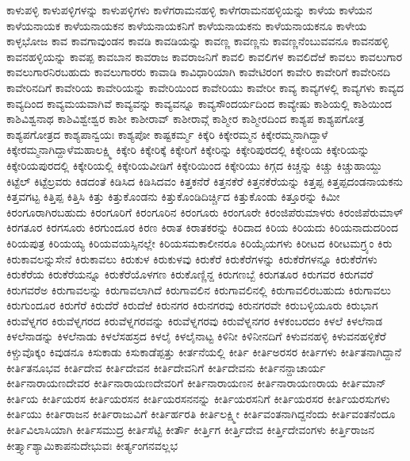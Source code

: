 {ಕಾಳುಪಳ್ಳಿ
ಕಾಳುಪಳ್ಳಿಗಳನ್ನು
ಕಾಳುಪಳ್ಳಿಗಳು
ಕಾಳೆಗರಾಮನಹಳ್ಳಿ
ಕಾಳೆಗರಾಮನಹಳ್ಳಿಯನ್ನು
ಕಾಳೆಯ
ಕಾಳೆಯನ
ಕಾಳೆಯನಾಯಕ
ಕಾಳೆಯನಾಯಕನ
ಕಾಳೆಯನಾಯಕನಿಗೆ
ಕಾಳೆಯನಾಯಕನು
ಕಾಳೆಯನಾಯಕನೂ
ಕಾಳೇಯ
ಕಾಳ್ಳಭೋಜ
ಕಾವ
ಕಾವಗಾವುಂಡನ
ಕಾವಡಿ
ಕಾವಡಿಯನ್ನು
ಕಾವಣ್ಣ
ಕಾವಣ್ಣನು
ಕಾವಣ್ಣನೆಂಬುವವನೂ
ಕಾವನಹಳ್ಳಿ
ಕಾವನಹಳ್ಳಿಯನ್ನು
ಕಾವಪ್ಪ
ಕಾವಬಾನ
ಕಾವರಾಜ
ಕಾವರಾಜನಿಗೆ
ಕಾವಲಿ
ಕಾವಲಿಗಳ
ಕಾವಲಿದೆಱೆ
ಕಾವಲು
ಕಾವಲುಗಾರ
ಕಾವಲುಗಾರನಿರಬಹುದು
ಕಾವಲುಗಾರರು
ಕಾವಾಡಿ
ಕಾವಿಧಾರಿಯಾಗಿ
ಕಾವೇಟಿರಂಗ
ಕಾವೇರಿ
ಕಾವೇರಿಗೆ
ಕಾವೇರಿನದಿ
ಕಾವೇರಿನದಿಗೆ
ಕಾವೇರಿಯ
ಕಾವೇರಿಯನ್ನು
ಕಾವೇರಿಯಿಂದ
ಕಾವೇರಿಯು
ಕಾವೇರೀ
ಕಾವ್ಯ
ಕಾವ್ಯಗಳಲ್ಲಿ
ಕಾವ್ಯಗಳು
ಕಾವ್ಯದ
ಕಾವ್ಯದಿಂದ
ಕಾವ್ಯಮಯವಾಗಿವೆ
ಕಾವ್ಯವನ್ನು
ಕಾವ್ಯವನ್ನೂ
ಕಾವ್ಯಸೌಂದರ್ಯದಿಂದ
ಕಾವ್ಯೇಷು
ಕಾಶಿಯಲ್ಲಿ
ಕಾಶಿಯಿಂದ
ಕಾಶಿವಿಶ್ವನಾಥ
ಕಾಶಿವಿಶ್ವೇಶ್ವರ
ಕಾಶೀ
ಕಾಶೀರಾವ್
ಕಾಶೀರಾವ್ಗೆ
ಕಾಶ್ಮೀರ
ಕಾಶ್ಮೀರದಿಂದ
ಕಾಶ್ಯಪ
ಕಾಶ್ಯಪಗೋತ್ರ
ಕಾಶ್ಯಪಗೋತ್ರದ
ಕಾಶ್ಯಪಾನ್ವಯಃ
ಕಾಶ್ಯಪೋ
ಕಾಷ್ಟಕರ್ಮ್ಮ
ಕಿಕ್ಕೆರಿ
ಕಿಕ್ಕೇರಮ್ಮನ
ಕಿಕ್ಕೇರಮ್ಮನಾಗಿದ್ದಾಳೆ
ಕಿಕ್ಕೇರಮ್ಮನಾಗಿದ್ದಾಳೆಮಹಾಲಕ್ಷ್ಮಿ
ಕಿಕ್ಕೇರಿ
ಕಿಕ್ಕೇರಿಕ್ಕೆ
ಕಿಕ್ಕೇರಿಗೆ
ಕಿಕ್ಕೇರಿನ್ನು
ಕಿಕ್ಕೇರಿಪುರದಲ್ಲಿ
ಕಿಕ್ಕೇರಿಯ
ಕಿಕ್ಕೇರಿಯನ್ನು
ಕಿಕ್ಕೇರಿಯಪುರದಲ್ಲಿ
ಕಿಕ್ಕೇರಿಯಲ್ಲಿ
ಕಿಕ್ಕೇರಿಯವೀಡಿಗೆ
ಕಿಕ್ಕೇರಿಯಿಂದ
ಕಿಕ್ಕೇರಿಯು
ಕಿಗ್ಗದ
ಕಿಚ್ಚನ್ನು
ಕಿಚ್ಚು
ಕಿಚ್ಚುಹಾಯ್ದು
ಕಿಟ್ಟೆಲ್
ಕಿಟ್ಟೆಲ್ರವರು
ಕಿಡದಂತೆ
ಕಿಡಿಸಿದ
ಕಿಡಿಸಿದವಂ
ಕಿತ್ತಕನೆರೆ
ಕಿತ್ತನಕೆರೆ
ಕಿತ್ತನಕೆರೆಯನ್ನು
ಕಿತ್ತಪ್ಪ
ಕಿತ್ತಪ್ಪದಂಡನಾಯಕನು
ಕಿತ್ತವಗಟ್ಟ
ಕಿತ್ತಿಪ್ಪ
ಕಿತ್ತಿಸಿ
ಕಿತ್ತು
ಕಿತ್ತುಕೊಂಡನು
ಕಿತ್ತುಕೊಂಡಿದಿರ್ಚ್ಚಿದ
ಕಿತ್ತುಕೊಂಡು
ಕಿತ್ತೂರನ್ನು
ಕಿಮೀ
ಕಿರಂಗೂರಾಗಿರಬಹುದು
ಕಿರಂಗೂರಿಗೆ
ಕಿರಂಗೂರಿನ
ಕಿರಂಗೂರು
ಕಿರಂಗೂರೇ
ಕಿರಂಜಿಪೆರುಮಾಳರು
ಕಿರಂಜಿಪೆರುಮಾಳ್
ಕಿರಗತೂರ
ಕಿರಗಸೂರು
ಕಿರಗುಂದೂರ
ಕಿರಣ
ಕಿರಾತ
ಕಿರಾತಕರನ್ನು
ಕಿರಿದಾದ
ಕಿರಿಯ
ಕಿರಿಯದು
ಕಿರಿಯನಾದುದರಿಂದ
ಕಿರಿಯಪುತ್ರ
ಕಿರಿಯಯ್ಯ
ಕಿರಿಯವಯಸ್ಸಿನಲ್ಲೇ
ಕಿರಿಯಸಮಕಾಲೀನರೂ
ಕಿರಿಯೈಯಗಳು
ಕಿರೀಟದ
ಕಿರೀಟಮಗ್ರ್ಯಂ
ಕಿರು
ಕಿರುಕಾವಲನ್ನುಸೇನೆ
ಕಿರುಕಾವಲು
ಕಿರುಕುಳ
ಕಿರುಕುಳವು
ಕಿರುಕೆರೆ
ಕಿರುಕೆರೆಗಳನ್ನು
ಕಿರುಕೆರೆಗಳನ್ನೂ
ಕಿರುಕೆರೆಗಳು
ಕಿರುಕೆರೆಯ
ಕಿರುಕೆರೆಯನ್ನೂ
ಕಿರುಕೆರೆಯೊಳಗಣ
ಕಿರುಕೊಣ್ಣಿನ್ದ
ಕಿರುಗಣಬ್ಬೆ
ಕಿರುಗತೂರ
ಕಿರುಗವರ
ಕಿರುಗವರೆ
ಕಿರುಗವರೆಅ
ಕಿರುಗಾವಲನ್ನು
ಕಿರುಗಾವಲಾಗಿದೆ
ಕಿರುಗಾವಲಿನ
ಕಿರುಗಾವಲಿನಲ್ಲಿ
ಕಿರುಗಾವಲಿರಬಹುದು
ಕಿರುಗಾವಲು
ಕಿರುಗುಂದೂರ
ಕಿರುಗೆರೆ
ಕಿರುದೆರೆ
ಕಿರುದೆಱೆ
ಕಿರುನಗರ
ಕಿರುನಗರವು
ಕಿರುನಗರವೇ
ಕಿರುಬಳ್ಳಿಯೂರು
ಕಿರುಭಾಗ
ಕಿರುವೆಳ್ನಗರ
ಕಿರುವೆಳ್ನಗರದ
ಕಿರುವೆಳ್ನಗರವನ್ನು
ಕಿರುವೆಳ್ನಗರವು
ಕಿರುವೆಳ್ನನಗರ
ಕಿಳಕಂಬರದಂ
ಕಿಳಲೆ
ಕಿಳಲೆನಾಡ
ಕಿಳಲೆನಾಡನ್ನು
ಕಿಳಲೆನಾಡು
ಕಿಳಲೆಸಹಸ್ರದ
ಕಿಳಲೈ
ಕಿಳಲೈನಾಟ್ಟ
ಕಿಳಿನೀ
ಕಿಳಿನೀನದಿಗೆ
ಕಿಳುವನಹಳ್ಳಿ
ಕಿಳುವನಹಳ್ಳಿಕೆರೆ
ಕಿಳ್ಚುವೊಕ್ಕಂ
ಕಿವುಡನೂ
ಕಿಸುಕಾಡು
ಕಿಸುಕಾಡೆಪ್ಪತ್ತು
ಕೀರ್ತನೆಯಲ್ಲಿ
ಕೀರ್ತಿ
ಕೀರ್ತಿಅರಸರ
ಕೀರ್ತಿಗಳು
ಕೀರ್ತಿತನಾಗಿದ್ದಾನೆ
ಕೀರ್ತಿತನೂಭವ
ಕೀರ್ತಿದೇವ
ಕೀರ್ತಿದೇವನ
ಕೀರ್ತಿದೇವನಿಗೆ
ಕೀರ್ತಿದೇವನು
ಕೀರ್ತಿನನ್ದಾಚಾರ್ಯ
ಕೀರ್ತಿನಾರಾಯಣದೇವರ
ಕೀರ್ತಿನಾರಾಯಣದೇವರಿಗೆ
ಕೀರ್ತಿನಾರಾಯಣನ
ಕೀರ್ತಿನಾರಾಯಣರಾಯ
ಕೀರ್ತಿಮಾನ್
ಕೀರ್ತಿಯ
ಕೀರ್ತಿಯರಸ
ಕೀರ್ತಿಯರಸನ
ಕೀರ್ತಿಯರಸನನನ್ನು
ಕೀರ್ತಿಯರಸನಿಗೆ
ಕೀರ್ತಿಯರಸರ
ಕೀರ್ತಿಯರಸುಗಳು
ಕೀರ್ತಿಯು
ಕೀರ್ತಿರಾಜನ
ಕೀರ್ತಿರಾಜುವಿಗೆ
ಕೀರ್ತಿರ್ಹರತಿ
ಕೀರ್ತಿಲಕ್ಷ್ಮೀ
ಕೀರ್ತಿವಂತನಾಗಿದ್ದನೆಂದು
ಕೀರ್ತಿವಂತನೆಂದೂ
ಕೀರ್ತಿವಿಲಾಸಿಯಾಗಿ
ಕೀರ್ತಿಸಮುದ್ರ
ಕೀರ್ತಿಸೆಟ್ಟಿ
ಕೀರ್ತೌ
ಕೀರ್ತ್ತಿಗ
ಕೀರ್ತ್ತಿದೇವ
ಕೀರ್ತ್ತಿದೇವಂಗಳು
ಕೀರ್ತ್ತಿರಾಜನ
ಕೀರ್ತ್ತ್ಯಾಶ್ಯಾಮಿಕಾಪನುದೇಭುವಃ
ಕೀರ್ತ್ಯಂಗನವಲ್ಲಭ
}

